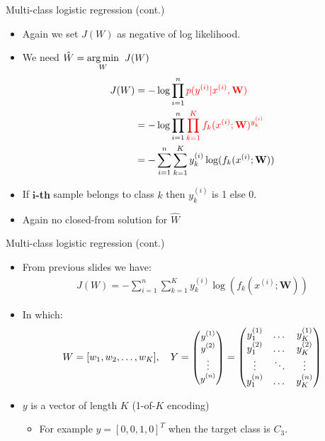 \documentclass[serif, aspectratio=169]{beamer}
\begin{document}
\begin{frame}{Multi-class logistic regression (cont.)}
    \begin{itemize}
        \item Again we set $J(W)$ as negative of log likelihood.
        \item We need $\hat{W} = \underset{W}{\arg\min} \hspace{0.2cm} J(W)$
        \begin{align*}
            J(W) &= -\log \prod_{i=1}^{n} \textcolor{red}{p(y^{(i)}|x^{(i)}, \mathbf{W})} \\
            &= -\log \prod_{i=1}^{n}\textcolor{red}{\prod_{k=1}^{K}f_k(x^{(i)}; \mathbf{W})^{y_k^{(i)}} }\\
            &= -\sum_{i=1}^{n}\sum_{k=1}^{K}y_k^{(i)} \log (f_k(x^{(i)}; \mathbf{W}))
        \end{align*}
        \item If \textbf{$\textbf{i}$-th} sample belongs to class $k$ then $y^{(i)}_k$ is 1 else 0.
        \item Again no closed-from solution for $\hat{W}$
    \end{itemize}
    
\end{frame}
\begin{frame}{Multi-class logistic regression (cont.)}
    \begin{itemize}
        \item From previous slides we have:
            \begin{align*}
                J(W) = -\sum_{i=1}^{n}\sum_{k=1}^{K}y_k^{(i)} \log (f_k(x^{(i)}; \mathbf{W}))
            \end{align*}
        \item In which:
             \[
        W = [w_1,w_2, \dots, w_K], \quad Y = 
        \text{\small $
        \begin{pmatrix}
            y^{(1)} \\
            y^{(2)} \\
            \vdots \\
            y^{(n)}
        \end{pmatrix}
        $}
        =
        \begin{pmatrix}
            y_1^{(1)} & \dots & y_K^{(1)} \\
            y_1^{(2)} & \dots & y_K^{(2)} \\
            \vdots    & \ddots & \vdots \\
            y_1^{(n)} & \dots & y_K^{(n)}
        \end{pmatrix}
    \]
    
        \item $y$ is a vector of length $K$ (1-of-$K$ encoding)
            \begin{itemize}
                \item For example $y=[0,0,1,0]^T$ when the target class is $C_3$.
            \end{itemize}
    \end{itemize}
\end{frame}
\end{document}
